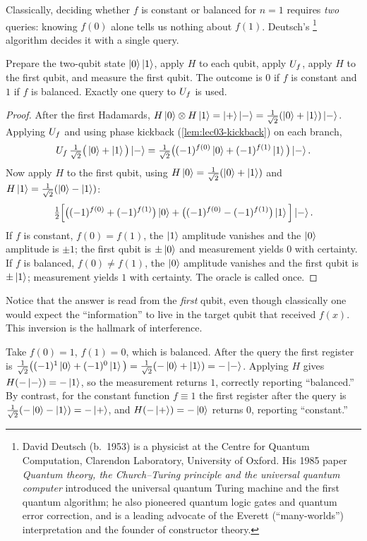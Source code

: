 Classically, deciding whether $f$ is constant or balanced for $n=1$ requires
\emph{two} queries: knowing $f(0)$ alone tells us nothing about $f(1)$. Deutsch's%
\footnote{David Deutsch (b.\ 1953) is a physicist at the Centre for Quantum
Computation, Clarendon Laboratory, University of Oxford. His 1985 paper
\emph{Quantum theory, the Church--Turing principle and the universal quantum
computer} introduced the universal quantum Turing machine and the first quantum
algorithm; he also pioneered quantum logic gates and quantum error correction, and
is a leading advocate of the Everett (``many-worlds'') interpretation and the
founder of constructor theory.}
algorithm decides it with a single query.

\begin{theorem}
\label{thm:lec03-deutsch}
Prepare the two-qubit state $\ket{0}\ket{1}$, apply $H$ to each qubit, apply
$U_{f}$, apply $H$ to the first qubit, and measure the first qubit. The outcome is
$0$ if $f$ is constant and $1$ if $f$ is balanced. Exactly one query to $U_{f}$ is
used.
\end{theorem}

\begin{proof}
After the first Hadamards,
$H\ket{0}\otimes H\ket{1}=\ket{+}\ket{-}=\tfrac{1}{\sqrt2}(\ket{0}+\ket{1})\ket{-}$.
Applying $U_{f}$ and using phase kickback (\cref{lem:lec03-kickback}) on each
branch,
\[
  U_{f}\,\tfrac{1}{\sqrt2}\big(\ket{0}+\ket{1}\big)\ket{-}
  =\tfrac{1}{\sqrt2}\big((-1)^{f(0)}\ket{0}+(-1)^{f(1)}\ket{1}\big)\ket{-}.
\]
Now apply $H$ to the first qubit, using $H\ket{0}=\tfrac{1}{\sqrt2}(\ket0+\ket1)$
and $H\ket{1}=\tfrac{1}{\sqrt2}(\ket0-\ket1)$:
\[
  \tfrac{1}{2}\Big[\big((-1)^{f(0)}+(-1)^{f(1)}\big)\ket{0}
  +\big((-1)^{f(0)}-(-1)^{f(1)}\big)\ket{1}\Big]\ket{-}.
\]
If $f$ is constant, $f(0)=f(1)$, the $\ket{1}$ amplitude vanishes and the
$\ket{0}$ amplitude is $\pm1$; the first qubit is $\pm\ket{0}$ and measurement
yields $0$ with certainty. If $f$ is balanced, $f(0)\neq f(1)$, the $\ket{0}$
amplitude vanishes and the first qubit is $\pm\ket{1}$; measurement yields $1$
with certainty. The oracle is called once.
\end{proof}

Notice that the answer is read from the \emph{first} qubit, even though
classically one would expect the ``information'' to live in the target qubit that
received $f(x)$. This inversion is the hallmark of interference.

\begin{example}[Deutsch on $f(a)=a\oplus 1$]
\label{exa:lec03-deutsch}
Take $f(0)=1$, $f(1)=0$, which is balanced. After the query the first register is
$\tfrac{1}{\sqrt2}\big((-1)^{1}\ket0+(-1)^{0}\ket1\big)=\tfrac{1}{\sqrt2}(-\ket0+\ket1)=-\ket{-}$.
Applying $H$ gives $H(-\ket{-})=-\ket{1}$, so the measurement returns $1$,
correctly reporting ``balanced.'' By contrast, for the constant function
$f\equiv 1$ the first register after the query is
$\tfrac{1}{\sqrt2}(-\ket0-\ket1)=-\ket{+}$, and $H(-\ket{+})=-\ket0$ returns $0$,
reporting ``constant.''
\end{example}

